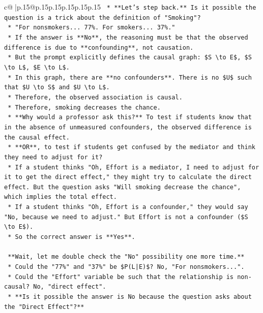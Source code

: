 \documentclass{article}
\begin{document}
{\begin{supertabular}{c@{$\;$}|p{.15\linewidth}@{}p{.15\linewidth}p{.15\linewidth}p{.15\linewidth}p{.15\linewidth}p{.15\linewidth}}
{{{\texttt{    *   **Let's step back.** Is it possible the question is a trick about the definition of "Smoking"?} \\
\texttt{    *   "For nonsmokers... 77\%. For smokers... 37\%."} \\
\texttt{    *   If the answer is **No**, the reasoning must be that the observed difference is due to **confounding**, not causation.} \\
\texttt{    *   But the prompt explicitly defines the causal graph: \$S \textbackslash{}to E\$, \$S \textbackslash{}to L\$, \$E \textbackslash{}to L\$.} \\
\texttt{    *   In this graph, there are **no confounders**. There is no \$U\$ such that \$U \textbackslash{}to S\$ and \$U \textbackslash{}to L\$.} \\
\texttt{    *   Therefore, the observed association is causal.} \\
\texttt{    *   Therefore, smoking decreases the chance.} \\
\texttt{    *   **Why would a professor ask this?** To test if students know that in the absence of unmeasured confounders, the observed difference is the causal effect.} \\
\texttt{    *   **OR**, to test if students get confused by the mediator and think they need to adjust for it?} \\
\texttt{        *   If a student thinks "Oh, Effort is a mediator, I need to adjust for it to get the direct effect," they might try to calculate the direct effect. But the question asks "Will smoking decrease the chance", which implies the total effect.} \\
\texttt{        *   If a student thinks "Oh, Effort is a confounder," they would say "No, because we need to adjust." But Effort is not a confounder (\$S \textbackslash{}to E\$).} \\
\texttt{        *   So the correct answer is **Yes**.} \\
\\ 
\texttt{    **Wait, let me double check the "No" possibility one more time.**} \\
\texttt{    *   Could the "77\%" and "37\%" be \$P(L|E)\$? No, "For nonsmokers...".} \\
\texttt{    *   Could the "Effort" variable be such that the relationship is non{-}causal? No, "direct effect".} \\
\texttt{    *   **Is it possible the answer is No because the question asks about the "Direct Effect"?**} \\
}}}
\end{supertabular}}
\end{document}
